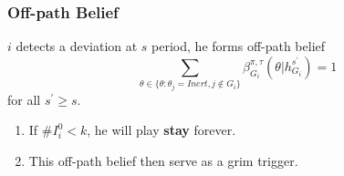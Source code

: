 \documentclass[10pt]{beamer}
\begin{document}
\begin{frame}
\frametitle{Off-path Belief}

$i$ detects a deviation at $s$ period, he forms off-path belief
\begin{equation}
\label{eq_grim_trigger}
\sum_{\theta \in \{\theta:\theta_j=Inert,j\notin G_i\}}\beta^{\pi,\tau}_{G_i}({\theta}|h^{s^{'}}_{G_i})=1
\end{equation}
for all $s^{'}\geq s$. 

\begin{enumerate}
\item If $\# I^0_i<k$, he will play \textbf{stay} forever.
\item This off-path belief then serve as a grim trigger.
\end{enumerate}




\end{frame}
\end{document}
